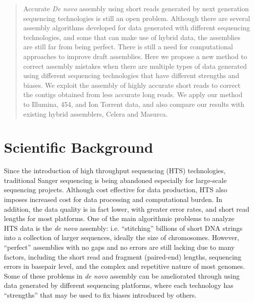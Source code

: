 \documentclass{llncs}
\begin{document}
\begin{abstract}
Accurate \textit{De novo} assembly using short reads generated by next generation sequencing technologies is still an open problem. Although there are several assembly algorithms developed for data generated with different sequencing technologies, and some that can make use of hybrid data, the assemblies are still far from being perfect. There is still a need for computational approaches to improve draft assemblies.
Here we propose a new method to correct assembly mistakes when there are multiple types of data generated using different sequencing technologies that have different strengths and biases. We exploit the assembly of highly accurate short reads to correct the contigs obtained from less accurate  long reads.
We apply our method to Illumina, 454, and Ion Torrent data, and also compare our results with existing hybrid assemblers, Celera and Masurca.
\end{abstract}
%
\section{Scientific Background}
Since the introduction of high throughput sequencing (HTS) technologies, traditional Sanger sequencing is being abandoned especially for large-scale sequencing projects.
Although cost effective for data production, HTS also imposes increased cost for data processing and computational burden. 
In addition, the data quality is in fact lower, with greater error rates, and short read lengths for most platforms. 
One of the main algorithmic problems to analyze HTS data is the \textit{de novo} assembly: i.e. ``stitching'' billions of short DNA strings into a collection of larger sequences, ideally the size of chromosomes. 
However, ``perfect'' assemblies with no gaps and no errors are still lacking due to many factors, including the short read and fragment (paired-end) lengths, sequencing errors in basepair level, and the complex and repetitive nature of most genomes. 
Some of these problems in \textit{de novo} assembly can be ameliorated through using data generated by different sequencing platforms, where each technology has ``strengths'' that may be used to fix biases introduced by others.
\end{document}
